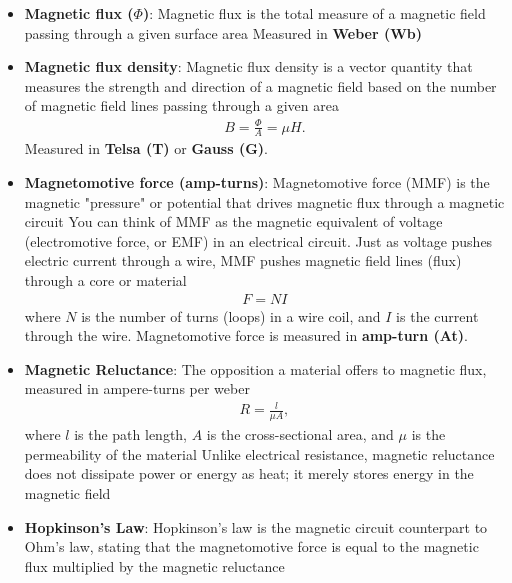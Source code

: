 \documentclass{report}
\begin{document}
\begin{itemize}
\begin{itemize}
                    $e$ is the \textbf{induced voltage}.
                \item \textbf{Magnetic flux ($\Phi$)}: Magnetic flux is the total measure of a magnetic field passing through a given surface area
                    \bigbreak \noindent 
                    Measured in \textbf{Weber (Wb)}
                \item \textbf{Magnetic flux density}:  Magnetic flux density is a vector quantity that measures the strength and direction of a magnetic field based on the number of magnetic field lines passing through a given area
                    \begin{align*}
                        B = \frac{\Phi}{A} = \mu H
                    .\end{align*}
                    Measured in \textbf{Telsa (T)} or \textbf{Gauss (G)}.
                \item \textbf{Magnetomotive force (amp-turns)}: Magnetomotive force (MMF) is the magnetic "pressure" or potential that drives magnetic flux through a magnetic circuit
                    \bigbreak \noindent 
                    You can think of MMF as the magnetic equivalent of voltage (electromotive force, or EMF) in an electrical circuit. Just as voltage pushes electric current through a wire, MMF pushes magnetic field lines (flux) through a core or material
                    \begin{align*}
                        F = NI
                    \end{align*}
                    where $N$ is the number of turns (loops) in a wire coil, and $I$ is the current through the wire. Magnetomotive force is measured in \textbf{amp-turn (At)}.
                \item \textbf{Magnetic Reluctance}:  The opposition a material offers to magnetic flux, measured in ampere-turns per weber
                    \begin{align*}
                        R = \frac{l}{\mu A}
                    ,\end{align*}
                    where $l$ is the path length, $A$ is the cross-sectional area, and $\mu$ is the permeability of the material
                    \bigbreak \noindent 
                    Unlike electrical resistance, magnetic reluctance does not dissipate power or energy as heat; it merely stores energy in the magnetic field
                \item \textbf{Hopkinson's Law}: Hopkinson's law is the magnetic circuit counterpart to Ohm's law, stating that the magnetomotive force is equal to the magnetic flux multiplied by the magnetic reluctance

\end{itemize}
\end{itemize}
\end{document}
